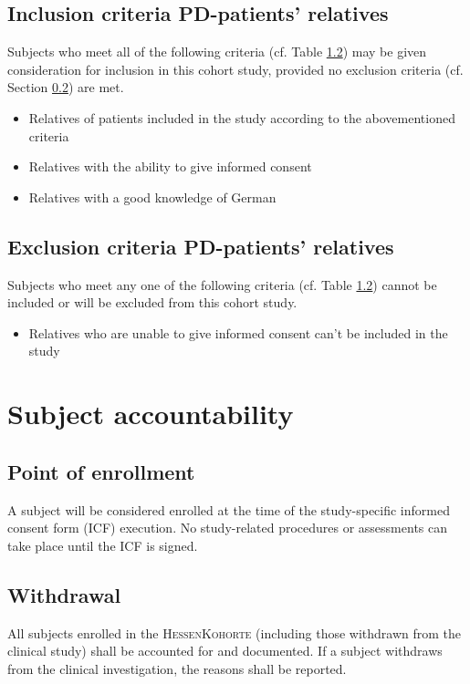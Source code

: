 \subsection{Inclusion criteria \ac{PD}-patients' relatives}
\label{sec:inclusion_criteriaREL}
Subjects who meet all of the following criteria (cf. Table \ref{}) may be given consideration for inclusion in this cohort study, provided no exclusion criteria (cf. Section \ref{sec:exclusion_criteriaREL}) are met.

\begin{itemize}
  \item Relatives of patients included in the study according to the abovementioned criteria 
  \item Relatives with the ability to give informed consent 
  \item Relatives with a good knowledge of German 
\end{itemize}

\subsection{Exclusion criteria \ac{PD}-patients' relatives}
\label{sec:exclusion_criteriaREL}
Subjects who meet any one of the following criteria (cf. Table \ref{}) cannot be included or will be excluded from this cohort study.
\begin{itemize}
  \item  Relatives who are unable to give informed consent can't be included in the study
\end{itemize}


\section{Subject accountability}

\subsection{Point of enrollment}
A subject will be considered enrolled at the time of the study-specific informed consent form (ICF) execution. No study-related procedures or assessments can take place until the ICF is signed.

\subsection{Withdrawal}
All subjects enrolled in the \textsc{HessenKohorte} (including those withdrawn from the clinical study) shall be accounted for and documented. If a subject withdraws from the clinical investigation, the reasons shall be reported.

